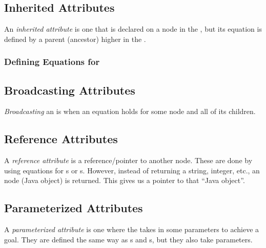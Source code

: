 \subsection{Inherited Attributes}\label{subsec:Inherited_Attributes}
\begin{definition}\label{def:Inherited_Attribute}
  An \emph{inherited attribute} is one that is declared on a node in the , but its equation is defined by a parent (ancestor) higher in the .
\end{definition}

\subsubsection{Defining Equations for }\label{subsubsec:Define_Inherited_Equations}

\subsection{Broadcasting Attributes}\label{subsec:Broadcasting_Attributes}
\begin{definition}[Broadcasting]\label{def:Broadcasting}
  \emph{Broadcasting} an  is when an equation holds for some node and all of its children.
\end{definition}

\subsection{Reference Attributes}\label{subsec:Reference_Attributes}
\begin{definition}\label{def:Reference_Attribute}
  A \emph{reference attribute} is a reference/pointer to another  node.
  These are done by using equations for s or s.
  However, instead of returning a string, integer, etc., an  node (Java object) is returned.
  This gives us a pointer to that ``Java object''.
\end{definition}

\subsection{Parameterized Attributes}\label{subsec:Parameterized_Attributes}
\begin{definition}\label{def:Parameterized_Attribute}
  A \emph{parameterized attribute} is one where the  takes in some parameters to achieve a  goal.
  They are defined the same way as s and s, but they also take parameters.
\end{definition}

